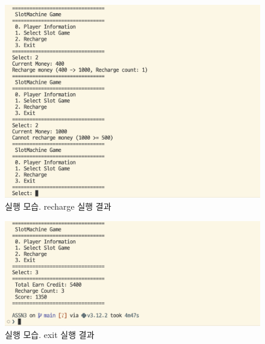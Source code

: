 \documentclass{article}
\begin{document}
\begin{figure}
  \includegraphics[width=\textwidth]{assets/screenshots/5.png}
  \caption{실행 모습. recharge 실행 결과}
  \label{img:5}
\end{figure}
\begin{figure}
  \includegraphics[width=\textwidth]{assets/screenshots/6.png}
  \caption{실행 모습. exit 실행 결과}
  \label{img:6}
\end{figure}
\end{document}
